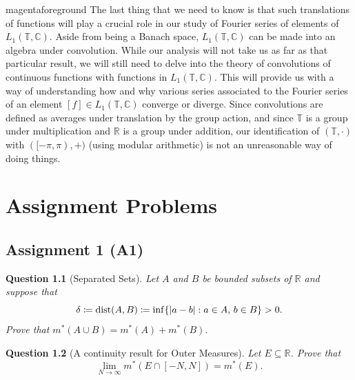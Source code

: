 \documentclass[notoc,notitlepage]{tufte-book}
\newtheorem{assgprob}{Question}[section]
\DeclareMathOperator{\dist}{dist}
\begin{document}
\begin{quotebox}{magenta}{foreground}
The last thing that we need to know is that such translations of functions will
play a crucial role in our study
of Fourier series of elements of $L_1(\mathbb{T}, \mathbb{C})$.
Aside from being a Banach space, $L_1(\mathbb{T}, \mathbb{C})$ can be made
into an algebra under convolution.
While our analysis will not take us as far as that particular result,
we will still need to delve into the theory of convolutions of continuous functions
with functions in $L_1(\mathbb{T}, \mathbb{C})$.
This will provide us with a way of understanding how and why various series
associated to the Fourier series of an element $[f] \in L_1(\mathbb{T}, \mathbb{C})$
converge or diverge.
Since convolutions are defined as averages under translation by the group action,
and since $\mathbb{T}$ is a group under multiplication
and $\mathbb{R}$ is a group under addition,
our identification of $(\mathbb{T}, \cdot)$ with $([-\pi, \pi), +)$
(using modular arithmetic) is not an unreasonable way of doing things.
\end{quotebox}


\chapter{Assignment Problems}%
\label{chp:assignment_problems}

\section{Assignment 1 (A1)}%
\label{sec:assignment_1}

\begin{assgprob}[Separated Sets]
  Let $A$ and $B$ be bounded subsets of $\mathbb{R}$
  and suppose that
  \begin{equation*}
    \delta \coloneqq \dist(A, B)
    \coloneqq \inf \{ \abs{a - b} : a \in A,\, b \in B \} > 0.
  \end{equation*}
  Prove that $m^*(A \cup B) = m^*(A) + m^*(B)$.
\end{assgprob}

\begin{assgprob}[A continuity result for Outer Measures]
  Let $E \subseteq \mathbb{R}$. Prove that
  \begin{equation*}
    \lim_{N \to \infty} m^*(E \cap [-N, N]) = m^*(E).
  \end{equation*}
\end{assgprob}
\end{document}
